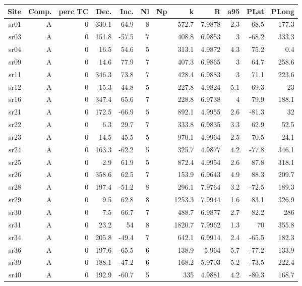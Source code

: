 \documentclass{article}
\begin{document}
\begin{longtable}{rrrrrrrrrrrr}
\hline
Site & Comp. & perc TC & Dec. & Inc. & Nl & Np & k     & R & a95 & PLat & PLong\\
\hline
sr01 & A & 0 & 330.1 & 64.9 & 8 &  & 572.7 & 7.9878 & 2.3 & 68.5 & 177.3\\
sr03 & A & 0 & 151.8 & -57.5 & 7 &  & 408.8 & 6.9853 & 3 & -68.2 & 333.3\\
sr04 & A & 0 & 16.5 & 54.6 & 5 &  & 313.1 & 4.9872 & 4.3 & 75.2 & 0.4\\
sr09 & A & 0 & 14.6 & 77.9 & 7 &  & 407.3 & 6.9865 & 3 & 64.7 & 258.6\\
sr11 & A & 0 & 346.3 & 73.8 & 7 &  & 428.4 & 6.9883 & 3 & 71.1 & 223.6\\
sr12 & A & 0 & 15.3 & 44.8 & 5 &  & 227.8 & 4.9824 & 5.1 & 69.3 & 23\\
sr16 & A & 0 & 347.4 & 65.6 & 7 &  & 228.8 & 6.9738 & 4 & 79.9 & 188.1\\
sr21 & A & 0 & 172.5 & -66.9 & 5 &  & 892.1 & 4.9955 & 2.6 & -81.3 & 32\\
sr22 & A & 0 & 6.3 & 29.7 & 7 &  & 333.8 & 6.9835 & 3.3 & 62.9 & 52.5\\
sr23 & A & 0 & 14.5 & 45.5 & 5 &  & 970.1 & 4.9964 & 2.5 & 70.5 & 24.1\\
sr24 & A & 0 & 163.3 & -62.2 & 5 &  & 325.7 & 4.9877 & 4.2 & -77.8 & 346.1\\
sr25 & A & 0 & 2.9 & 61.9 & 5 &  & 872.4 & 4.9954 & 2.6 & 87.8 & 318.1\\
sr26 & A & 0 & 358.6 & 62.5 & 7 &  & 153.9 & 6.9643 & 4.9 & 88.3 & 209.7\\
sr28 & A & 0 & 197.4 & -51.2 & 8 &  & 296.1 & 7.9764 & 3.2 & -72.5 & 189.3\\
sr29 & A & 0 & 9.5 & 62.8 & 8 &  & 1253.3 & 7.9944 & 1.6 & 83.1 & 326.9\\
sr30 & A & 0 & 7.5 & 66.7 & 7 &  & 488.7 & 6.9877 & 2.7 & 82.2 & 286\\
sr31 & A & 0 & 23.2 & 54 & 8 &  & 1820.7 & 7.9962 & 1.3 & 70 & 355.8\\
sr34 & A & 0 & 205.8 & -49.4 & 7 &  & 642.1 & 6.9914 & 2.4 & -65.5 & 182.3\\
sr36 & A & 0 & 197.6 & -65.5 & 6 &  & 138.9 & 5.964 & 5.7 & -77.2 & 133.9\\
sr39 & A & 0 & 188.1 & -47.2 & 6 &  & 168.2 & 5.9703 & 5.2 & -73.5 & 222.4\\
sr40 & A & 0 & 192.9 & -60.7 & 5 &  & 335 & 4.9881 & 4.2 & -80.3 & 168.7\\
\hline
\end{longtable}
\end{document}
